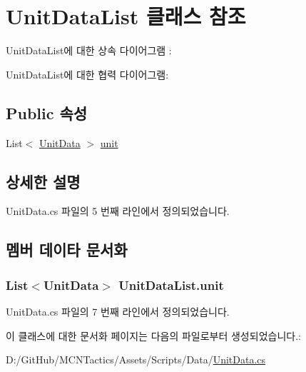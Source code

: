 \hypertarget{class_unit_data_list}{}\section{Unit\+Data\+List 클래스 참조}
\label{class_unit_data_list}


Unit\+Data\+List에 대한 상속 다이어그램 \+: 


Unit\+Data\+List에 대한 협력 다이어그램\+:
\subsection*{Public 속성}
\begin{DoxyCompactItemize}
\item 
List$<$ \hyperlink{class_unit_data}{Unit\+Data} $>$ \hyperlink{class_unit_data_list_adae809e0379b28516a8888c65b4e6573}{unit}
\end{DoxyCompactItemize}


\subsection{상세한 설명}


Unit\+Data.\+cs 파일의 5 번째 라인에서 정의되었습니다.



\subsection{멤버 데이타 문서화}
\subsubsection[{\texorpdfstring{unit}{unit}}]{\setlength{\rightskip}{0pt plus 5cm}List$<${\bf Unit\+Data}$>$ Unit\+Data\+List.\+unit}\hypertarget{class_unit_data_list_adae809e0379b28516a8888c65b4e6573}{}\label{class_unit_data_list_adae809e0379b28516a8888c65b4e6573}


Unit\+Data.\+cs 파일의 7 번째 라인에서 정의되었습니다.



이 클래스에 대한 문서화 페이지는 다음의 파일로부터 생성되었습니다.\+:\begin{DoxyCompactItemize}
\item 
D\+:/\+Git\+Hub/\+M\+C\+N\+Tactics/\+Assets/\+Scripts/\+Data/\hyperlink{_unit_data_8cs}{Unit\+Data.\+cs}\end{DoxyCompactItemize}
